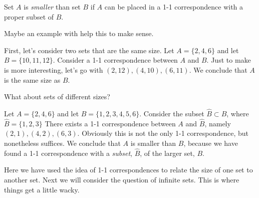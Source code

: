 \begin{idea}
Set $A$ is \emph{smaller} than set $B$ if $A$ can be placed in a 1-1 correspondence with a proper subset of $B$.
\end{idea}\label{setsize}
Maybe an example with help this to make sense.  
\begin{example} First, let's consider two sets that are the same size.
Let $A = \{2, 4, 6\}$ and let $B =\{10, 11, 12\}$.  Consider a 1-1 correspondence between $A$ and $B$.  Just to make is more interesting, let's go with $(2, 12), (4, 10), (6, 11)$. We conclude that $A$ is the same size as $B$.
\end{example}
What about sets of different sizes?
\begin{example}
Let $A = \{2, 4, 6\}$ and let $B =\{1, 2, 3, 4, 5, 6\}$.  Consider the subset $\hat{B} \subset B$, where $\hat{B} = \{ 1, 2, 3\}$  There exists a 1-1 correspondence between $A$ and $\hat{B}$, namely $(2, 1), (4, 2), (6, 3)$.  Obviously this is not the only 1-1 correspondence, but nonetheless suffices.  We conclude that $A$ is smaller than $B$, because we have found a 1-1 correspondence with a \emph{subset}, $\hat B$, of the larger set, $B$.
\end{example}
Here we have used the idea of 1-1 correspondences to relate the size of one set to another set.  Next we will consider the question of infinite sets.  This is where things get a little wacky.



